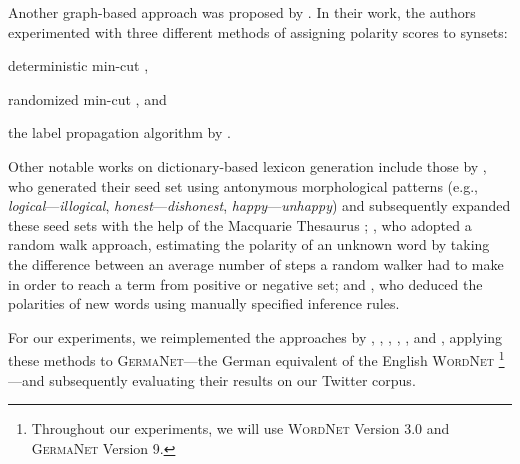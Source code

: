 Another graph-based approach was proposed by \citet{Rao:09}.  In their
work, the authors experimented with three different methods of
assigning polarity scores to synsets:
\begin{inparaenum}
\item deterministic min-cut \cite{Blum:01},
\item randomized min-cut \cite{Blum:04}, and
\item the label propagation algorithm by \citet{Zhu:02}.
\end{inparaenum}

Other notable works on dictionary-based lexicon generation include
those by \citet{Mohammad:09}, who generated their seed set using
antonymous morphological patterns (e.g.,
\emph{logical}---\emph{illogical}, \emph{honest}---\emph{dishonest},
\emph{happy}---\emph{unhappy}) and subsequently expanded these seed
sets with the help of the Macquarie Thesaurus \cite{Bernard:86};
\citet{Awadallah:10}, who adopted a random walk approach, estimating
the polarity of an unknown word by taking the difference between an
average number of steps a random walker had to make in order to reach
a term from positive or negative set; and \citet{Dragut:10}, who
deduced the polarities of new words using manually specified inference
rules.


For our experiments, we reimplemented the approaches by \citet{Hu:04},
\citet{Blair-Goldensohn:08}, \citet{Kim:04,Kim:06}, \citet{Esuli:06c},
\citet{Rao:09}, and \citet{Awadallah:10}, applying these methods to
\textsc{GermaNet}---the German equivalent of the English
\textsc{WordNet} \cite{Hamp:97}\footnote{Throughout our experiments,
  we will use \textsc{WordNet} Version 3.0 and \textsc{GermaNet}
  Version 9.}---and subsequently evaluating their results on our
Twitter corpus.

